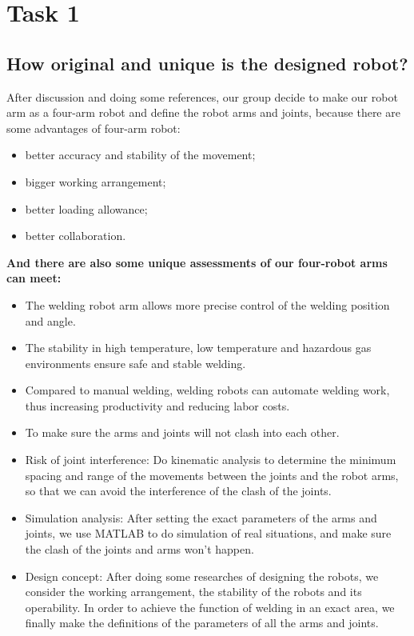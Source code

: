 \section{Task 1}
\FloatBarrier %


\subsection{How original and unique is the designed robot?}

After discussion and doing some references, our group decide to make our robot arm as a four-arm robot and define the robot arms and joints, because there are some advantages of four-arm robot:

\begin{itemize}
\item better accuracy and stability of the movement;
\item bigger working arrangement;
\item better loading allowance;
\item better collaboration.
\end{itemize}


\textbf{And there are also some unique assessments of our four-robot arms can meet:}

\begin{itemize}
\item The welding robot arm allows more precise control of the welding position and angle.
\item The stability in high temperature, low temperature and hazardous gas environments ensure safe and stable welding.
\item Compared to manual welding, welding robots can automate welding work, thus increasing productivity and reducing labor costs.
\item To make sure the arms and joints will not clash into each other.
\item Risk of joint interference: Do kinematic analysis to determine the minimum spacing and range of the movements between the joints and the robot arms, so that we can avoid the interference of the clash of the joints.
\item Simulation analysis: After setting the exact parameters of the arms and joints, we use MATLAB to do simulation of real situations, and make sure the clash of the joints and arms won't happen.
\item Design concept: After doing some researches of designing the robots, we consider the working arrangement, the stability of the robots and its operability. In order to achieve the function of welding in an exact area, we finally make the definitions of the parameters of all the arms and joints.
\end{itemize}










